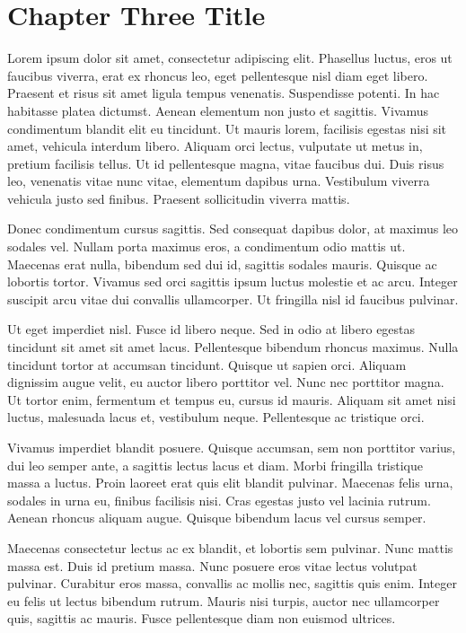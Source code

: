 \chapter{Chapter Three Title}
Lorem ipsum dolor sit amet, consectetur adipiscing elit. Phasellus luctus, eros ut faucibus viverra, erat ex rhoncus leo, eget pellentesque nisl diam eget libero. Praesent et risus sit amet ligula tempus venenatis. Suspendisse potenti. In hac habitasse platea dictumst. Aenean elementum non justo et sagittis. Vivamus condimentum blandit elit eu tincidunt. Ut mauris lorem, facilisis egestas nisi sit amet, vehicula interdum libero. Aliquam orci lectus, vulputate ut metus in, pretium facilisis tellus. Ut id pellentesque magna, vitae faucibus dui. Duis risus leo, venenatis vitae nunc vitae, elementum dapibus urna. Vestibulum viverra vehicula justo sed finibus. Praesent sollicitudin viverra mattis.

Donec condimentum cursus sagittis. Sed consequat dapibus dolor, at maximus leo sodales vel. Nullam porta maximus eros, a condimentum odio mattis ut. Maecenas erat nulla, bibendum sed dui id, sagittis sodales mauris. Quisque ac lobortis tortor. Vivamus sed orci sagittis ipsum luctus molestie et ac arcu. Integer suscipit arcu vitae dui convallis ullamcorper. Ut fringilla nisl id faucibus pulvinar.

Ut eget imperdiet nisl. Fusce id libero neque. Sed in odio at libero egestas tincidunt sit amet sit amet lacus. Pellentesque bibendum rhoncus maximus. Nulla tincidunt tortor at accumsan tincidunt. Quisque ut sapien orci. Aliquam dignissim augue velit, eu auctor libero porttitor vel. Nunc nec porttitor magna. Ut tortor enim, fermentum et tempus eu, cursus id mauris. Aliquam sit amet nisi luctus, malesuada lacus et, vestibulum neque. Pellentesque ac tristique orci.

Vivamus imperdiet blandit posuere. Quisque accumsan, sem non porttitor varius, dui leo semper ante, a sagittis lectus lacus et diam. Morbi fringilla tristique massa a luctus. Proin laoreet erat quis elit blandit pulvinar. Maecenas felis urna, sodales in urna eu, finibus facilisis nisi. Cras egestas justo vel lacinia rutrum. Aenean rhoncus aliquam augue. Quisque bibendum lacus vel cursus semper.

Maecenas consectetur lectus ac ex blandit, et lobortis sem pulvinar. Nunc mattis massa est. Duis id pretium massa. Nunc posuere eros vitae lectus volutpat pulvinar. Curabitur eros massa, convallis ac mollis nec, sagittis quis enim. Integer eu felis ut lectus bibendum rutrum. Mauris nisi turpis, auctor nec ullamcorper quis, sagittis ac mauris. Fusce pellentesque diam non euismod ultrices. 

